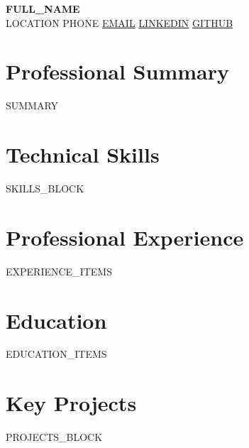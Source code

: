 \documentclass[10pt,letterpaper]{article}
\begin{document}
\begin{center}
  {\Huge \textbf{{{FULL_NAME}}}} \\ \vspace{4pt}
  \small
  {{LOCATION}} \textbar{} 
  {{PHONE}} \textbar{} 
  \href{mailto:{{EMAIL}}}{{{EMAIL}}} \textbar{} 
  \href{https://{{LINKEDIN}}}{{{LINKEDIN}}} \textbar{} 
  \href{https://{{GITHUB}}}{{{GITHUB}}}
\end{center}

\vspace{-4pt}

\section{Professional Summary}
{{SUMMARY}}

\section{Technical Skills}
{{SKILLS_BLOCK}}

\section{Professional Experience}
{{EXPERIENCE_ITEMS}}

\section{Education}
{{EDUCATION_ITEMS}}

\section{Key Projects}
{{PROJECTS_BLOCK}}
\end{document}
